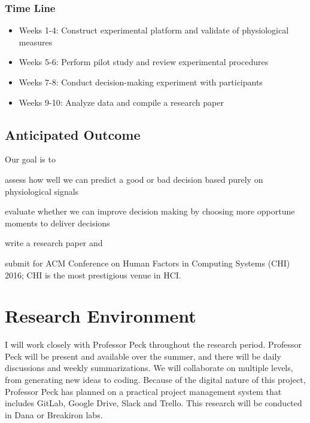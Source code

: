 \documentclass[12pt]{article}
\begin{document}
\subsubsection{Time Line}\label{timeline}
\begin{itemize} 
\itemsep0pt\parskip0pt
\item Weeks 1-4: Construct experimental platform and validate of physiological measures
\item Weeks 5-6: Perform pilot study and review experimental procedures
\item Weeks 7-8: Conduct decision-making experiment with participants
\item Weeks 9-10: Analyze data and compile a research paper
\end{itemize}


\subsection{Anticipated Outcome}\label{anticipated-outcome}
Our goal is to 
\begin{inparaenum}[\itshape 1\upshape)]
\item
  assess how well we can predict a good or bad decision based purely on physiological signals
\item 
  evaluate whether we can improve decision making by choosing more opportune moments to deliver decisions
\item
  write a research paper and
\item
  submit for ACM Conference on Human Factors in Computing Systems (CHI) 2016; CHI is the most prestigious venue in HCI.
\end{inparaenum}






\section{Research Environment}\label{research-environment}

I will work closely with Professor Peck throughout the research period.
Professor Peck will be present and available over the summer, and there
will be daily discussions and weekly summarizations. We will collaborate
on multiple levels, from generating new ideas to coding. Because of the
digital nature of this project, Professor Peck has planned on a
practical project management system that includes GitLab, Google Drive, Slack and Trello. This research will be conducted in Dana or Breakiron labs.

    
\printbibliography
    
\end{document}
